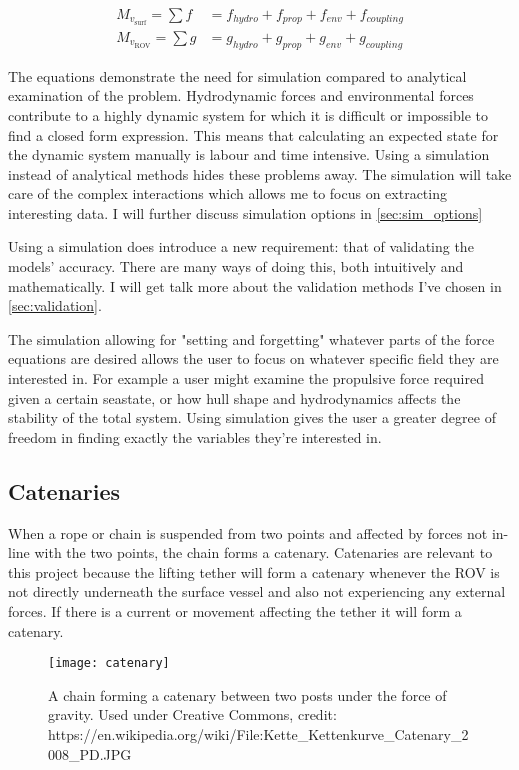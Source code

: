 \begin{align}
M_{v_{\text{surf}}} = \sum f &= f_{hydro} + f_{prop} + f_{env} + f_ {coupling} \label{eq:usv}\\
M_{v_{\text{ROV}}} = \sum g &= g_{hydro} + g_{prop} + g_{env} + g_ {coupling} \label{eq:rov}
\end{align}

The equations demonstrate the need for simulation compared to analytical examination of the problem. Hydrodynamic forces and environmental forces contribute to a highly dynamic system for which it is difficult or impossible to find a closed form expression. This means that calculating an expected state for the dynamic system manually is labour and time intensive. Using a simulation instead of analytical methods hides these problems away. The simulation will take care of the complex interactions which allows me to focus on extracting interesting data. I will further discuss simulation options in \cref{sec:sim_options}

Using a simulation does introduce a new requirement: that of validating the models' accuracy. There are many ways of doing this, both intuitively and mathematically. I will get talk more about the validation methods I've chosen in \cref{sec:validation}. 

The simulation allowing for "setting and forgetting" whatever parts of the force equations are desired allows the user to focus on whatever specific field they are interested in. For example a user might examine the propulsive force required given a certain seastate, or how hull shape and hydrodynamics affects the stability of the total system. Using simulation gives the user a greater degree of freedom in finding exactly the variables they're interested in.

\subsection{Catenaries}
\label{sec:catenary}
When a rope or chain is suspended from two points and affected by forces not in-line with the two points, the chain forms a catenary. Catenaries are relevant to this project because the lifting tether will form a catenary whenever the ROV is not directly underneath the surface vessel and also not experiencing any external forces. If there is a current or movement affecting the tether it will form a catenary. 

\begin{figure}
	\centering
	\texttt{[image: catenary]}
	\caption{A chain forming a catenary between two posts under the force of gravity. Used under Creative Commons, credit: https://en.wikipedia.org/wiki/File:Kette\_Kettenkurve\_Catenary\_2008\_PD.JPG}
	\label{fig:catenary}
\end{figure}

